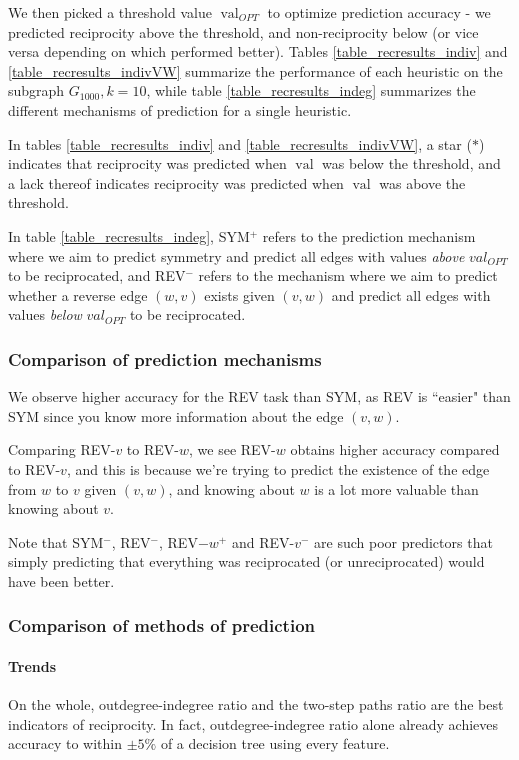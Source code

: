 \documentclass[conference]{IEEEtran}
\begin{document}
We then picked a threshold value $\operatorname{val}_{OPT}$ to optimize prediction accuracy - we predicted reciprocity above the threshold, and non-reciprocity below (or vice versa depending on which performed better). 
Tables \ref{table_recresults_indiv} and \ref{table_recresults_indivVW} summarize the performance of each heuristic on the subgraph $G_{1000}, k=10$, while table \ref{table_recresults_indeg} summarizes the different mechanisms of prediction for a single heuristic.

In tables \ref{table_recresults_indiv} and \ref{table_recresults_indivVW}, a star ($*$) indicates that reciprocity was predicted when $\operatorname{val}$ was below the threshold, and a lack thereof indicates reciprocity was predicted when $\operatorname{val}$ was above the threshold.

In table \ref{table_recresults_indeg}, SYM$^+$ refers to the prediction mechanism where we aim to predict symmetry and predict all edges with values \emph{above} $val_{OPT}$ to be reciprocated, and REV$^-$ refers to the mechanism where we aim to predict whether a reverse edge $(w,v)$ exists given $(v,w)$ and predict all edges with values \emph{below} $val_{OPT}$ to be reciprocated. 

\subsubsection{Comparison of prediction mechanisms}
We observe higher accuracy for the REV task than SYM, as REV is ``easier" than SYM since you know more information about the edge $(v,w)$.

Comparing REV-$v$ to REV-$w$, we see REV-$w$ obtains higher accuracy compared to REV-$v$, and this is because we're trying to predict the existence of the edge from $w$ to $v$ given $(v,w)$, and knowing about $w$ is a lot more valuable than knowing about $v$.

Note that SYM$^-$, REV$^-$, REV$-w^+$ and REV-$v^-$ are such poor predictors that simply predicting that everything was reciprocated (or unreciprocated) would have been better.

\subsubsection{Comparison of methods of prediction}

\paragraph{Trends}
On the whole, outdegree-indegree ratio and the two-step paths ratio are the best indicators of reciprocity. 
In fact, outdegree-indegree ratio alone already achieves accuracy to within $\pm 5\%$ of a decision tree using every feature.
\end{document}
